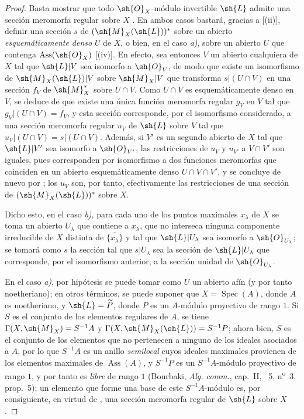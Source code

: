 \begin{proof}
Basta mostrar que todo $\sh{O}_X$-módulo invertible $\sh{L}$ admite una sección meromorfa regular sobre $X$ .
En ambos casos bastará, gracias a [(ii)], definir una sección $s$ de $(\sh{M}_X(\sh{L}))^*$ sobre un abierto \emph{esquemáticamente denso} $U$ de $X$, o bien, en el caso \emph{a)}, sobre un abierto $U$ que contenga $\operatorname{Ass}(\sh{O}_X)$ [(iv)].
En efecto, sea entonces $V$ un abierto cualquiera de $X$ tal que $\sh{L}|V$ sea isomorfo a $\sh{O}_V$, de modo que existe un isomorfismo de $\sh{M}_X(\sh{L})|V$ sobre $\sh{M}_X|V$ que transforma $s|(U\cap V)$ en una sección $f_V$ de $\sh{M}_X^*$ sobre $U\cap V$.
Como $U\cap V$ es esquemáticamente denso en $V$, se deduce de  que existe una única función meromorfa regular $g_V$ en $V$ tal que $g_V|(U\cap V)=f_V$, y esta sección corresponde, por el isomorfismo considerado, a una sección meromorfa regular $u_V$ de $\sh{L}$ sobre $V$ tal que $u_V|(U\cap V)=s|(U\cap V)$.
Además, si $V'$ es un segundo abierto de $X$ tal que $\sh{L}|V'$ sea isomorfo a $\sh{O}_{V'}$, las restricciones de $u_V$ y $u_{V'}$ a $V\cap V'$ son iguales, pues corresponden por isomorfismo a dos funciones meromorfas que coinciden en un abierto esquemáticamente denso $U\cap V\cap V'$, y se concluye de nuevo por ;
los $u_V$ son, por tanto, efectivamente las restricciones de una sección de $(\sh{M}_X(\sh{L}))^*$ sobre $X$.

Dicho esto, en el caso \emph{b)}, para cada uno de los puntos maximales $x_\lambda$ de $X$ se toma un abierto $U_\lambda$ que contiene a $x_\lambda$, que no interseca ninguna componente irreducible de $X$ distinta de $\overline{\{x_\lambda\}}$ y tal que $\sh{L}|U_\lambda$ sea isomorfo a $\sh{O}_{U_\lambda}$;
se tomará como $s$ la sección tal que $s|U_\lambda$ sea la sección de $\sh{L}|U_\lambda$ que corresponde, por el isomorfismo anterior, a la sección unidad de $\sh{O}_{U_\lambda}$.

En el caso \emph{a)}, por hipótesis se puede tomar como $U$ un abierto afín (y por tanto noetheriano); en otros términos, se puede suponer que $X=\operatorname{Spec}(A)$, donde $A$ es noetheriano, y $\sh{L}=\widetilde{P}$, donde $P$ es un $A$-módulo proyectivo de rango $1$.
Si $S$ es el conjunto de los elementos regulares de $A$, se tiene $\Gamma(X,\sh{M}_X)=S^{-1}A$  y $\Gamma(X,\sh{M}_X(\sh{L}))=S^{-1}P$;
ahora bien, $S$ es el conjunto de los elementos que no pertenecen a ninguno de los ideales asociados a $A$, por lo que $S^{-1}A$ es un anillo \emph{semilocal} cuyos ideales maximales provienen de los elementos maximales de $\operatorname{Ass}(A)$, y $S^{-1}P$ es un $S^{-1}A$-módulo proyectivo de rango $1$, y por tanto es \emph{libre} de rango $1$ (Bourbaki, \emph{Alg. comm.}, cap.~II, \textsection~5, n\textsuperscript{o}~3, prop.~5);
un elemento que forme una base de este $S^{-1}A$-módulo es, por consiguiente, en virtud de , una sección meromorfa regular de $\sh{L}$ sobre $X$.
\end{proof}

